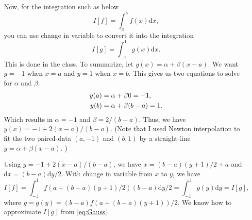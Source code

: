 \documentclass[11pt,a4paper]{article}
\newcommand{\dd}{\mathrm{d}}
\begin{document}
Now, for the integration such as below
\begin{equation}
I[f] = \int_a^b f(x) \dd x,
\end{equation}
you can use change in variable to convert it into the integration 
\begin{equation}
I[g]  = \int_{-1}^1 g(x) \dd x .
\end{equation}
This is done in the class. To summarize, let $y(x) = \alpha + \beta (x - a)$. We want $y=-1$ when $x = a$ and $y=1$ when $x = b$. This gives us two equations to solve for $\alpha$ and $\beta$:
\begin{align}
y(a) &= \alpha + \beta 0 = -1, \notag \\
y(b) &= \alpha + \beta (b - a) = 1.
\end{align}
Which results in $\alpha = -1$ and $\beta = 2/(b - a)$. Thus, we have $y(x) = -1 + 2(x-a)/(b - a)$. (Note that I used Newton interpolation to fit the two paired-data $(a, -1)$ and $(b, 1)$ by a straight-line $y = \alpha + \beta (x - a)$. )

Using $y = -1 + 2(x-a)/(b-a)$, we have $x = (b-a)(y+1)/2 + a$ and $\dd x =  (b-a) \dd y / 2$. With change in variable from $x$ to $y$, we have
\begin{equation}
I[f] = \int_{-1}^1 f(a + (b-a)(y+1)/2) (b-a) \dd y / 2 = \int_{-1}^1 g(y) \dd y = I[g],
\end{equation}
where $g = g(y) = (b-a) f(a + (b-a)(y+1)) / 2$. We know how to approximate $I[g]$ from \eqref{eq:Gauss}.
\end{document}
